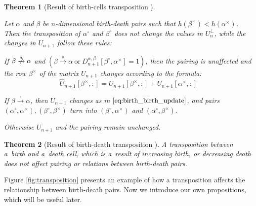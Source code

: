 \documentclass[a4paper,12pt, USenglish,cleveref,autoref,thm-restate]{article}
\newtheorem{theorem}{Theorem}
\newtheorem{proposition}[theorem]{Proposition}
\newcommand{\mf}{h}
\DeclareMathOperator{\bd}{BD}
\newcommand{\mU}{U}
\newcommand{\hmU}{\mU}
\newcommand{\hmUaft}{\hat{\mU}}
\newcommand{\hmUbef}{\mU}
\newcommand{\cmU}{\mU^{\perp}}
\newcommand{\mD}{D}
\newcommand{\bth}[1]{#1^\circ}
\newcommand{\dth}[1]{#1^{\!\times}}
\newcommand{\homo}{\xrightarrow{\times}}
\newcommand{\rel}{\rightarrow}
\newcommand{\cohomo}{\xrightarrow{\circ}}
\newcommand{\nocohomo}{\centernot{\xrightarrow{\circ}}}
\newcommand{\bds}{\alpha}
\newcommand{\bdt}{\beta}
\begin{document}
\begin{theorem}[Result of birth-cells transposition {\cite[Lemma~3.3]{TransDepth}}]\label{thm:birth_transposition}

Let $\bds$ and $\bdt$ be $n$-dimensional birth-death pairs such that $\mf(\dth\bdt) < \mf(\dth\bds)$. Then the transposition of $\bth\bds$ and $\bth\bdt$ does not change the values in $\cmU_{n}$, while the changes in $\hmU_{n+1}$ follow these rules:

\begin{bracketenumerate}
 
 \item  If $\bdt \nocohomo \bds$ and $\left( \bdt \homo \bds~\textrm{or}~\mD_{n+1}^{\bds,\bdt}[\bth\bdt,\dth\bds] = 1 \right)$, then the pairing is unaffected and the row $\dth\bdt$ of the matrix $\hmU_{n+1}$ changes according to the formula:
%
    \begin{equation}\label{eq:birth_birth_update}
          \hmUaft_{n+1}[\dth\bdt,:] = \hmUbef_{n+1}[\dth\bdt,:]+\hmUbef_{n+1}[\dth\bds,:]
    \end{equation}

\item  If $\bdt \cohomo \bds$, then $\hmU_{n+1}$ changes as in $\eqref{eq:birth_birth_update}$, and pairs $(\bth\bds,\dth\bds), (\bth\bdt,\dth\bdt)$ turn into $(\bth\bdt,\dth\bds)$ and $(\bth\bds,\dth\bdt)$.

\item Otherwise $\hmU_{n+1}$ and the pairing remain unchanged.

    \end{bracketenumerate}
\end{theorem}

\begin{theorem}[Result of birth-death transposition {\cite[Lemma~3.5]{TransDepth}}]\label{thm:mixed_transposition}
A transposition between a~birth and a~death cell, which is a~result of increasing birth, or decreasing death does not affect pairing or relations between birth-death pairs. 
\end{theorem} 

\noindent Figure \ref{fig:transposition} presents an example of how a transposition affects the relationship between birth-death pairs.
Now we introduce our own propositions, which will be useful later.








\end{document}
